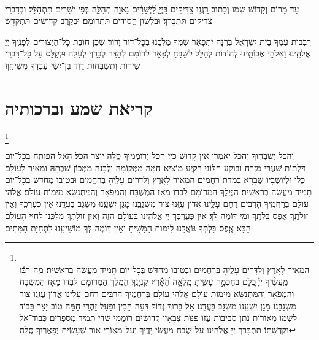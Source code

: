 \documentclass[twoside, openany, parskip=half, 11pt]{book}
\begin{document}
\\
עַד מָרוֹם וְקָדוֹשׁ שְׁמוֹ וְכָתוּב׃ רַֽנֲנ֣וּ צַ֭דִּיקִים בַּֽיְיָ֑ לַ֝יְשָׁרִ֗ים נָאוָ֥ה תְהִלָּֽה׃ בְּפִי יְשָׁרִים תִּתְהַלָּל׃ וּבְדִבְרֵי צַדִּיקִים תִּתְבָּרַךְ׃ וּבִלְשׁוֹן חֲסִידִים תִּתְרוֹמָם׃ וּבְקֶֽרֶב קְדוֹשִׁים תִּתְקַדָּשׁ׃

רִבְבוֹת עַמְּךָ בֵּית יִשְׂרָאֵל בְּרִנָּה יִתְפָּאַר שִׁמְךָ מַלְכֵּֽנוּ בְּכׇל־דּוֹר וָדוֹר׃ שֶׁכֵּן חוֹבַת כׇּל־הַיְצוּרִים לְפָנֶֽיךָ יְיָ אֱלֹהֵֽינוּ וֵאלֹהֵי אֲבוֹתֵֽינוּ לְהוֹדוֹת לְהַלֵּל לְשַׁבֵּֽחַ לְפָאֵר לְרוֹמֵם לְהַדֵּר לְבָרֵךְ לְעַלֵּה וּלְקַלֵּס עַל כׇּל־דִּבְרֵי שִׁירוֹת וְתֻשְׁבְּחוֹת דָּוִד בֶּן־יִשַׁי עַבְדְּךָ מְשִׁיחֶֽךָ׃


\yishtabach
\mimaamakim
\halfkaddish

\section[קריאת שמע וברכותיה]{ קריאת שמע וברכותיה }

\barachu


\footnote{\\
הַמֵּאִיר לָאָֽרֶץ וְלַדָּרִים עָלֶֽיהָ בְּרַחֲמִים וּבְטוּבוֹ מְחַדֵּשׁ בְּכׇל־יוֹם תָּמִיד מַעֲשֵׂה בְרֵאשִׁית׃
מָֽה־רַבּ֬וּ מַֽעֲשֶׂ֨יךָ יְיָ֗ ֖כֻּלָּם בְּחָכְמָ֣ה עָשִׂ֑יתָ מָֽלְאָ֥ה הָ֝אָ֗רֶץ קִנְיָנֶֽךָ׃ הַמֶּֽלֶךְ הַמְרוֹמָם לְבַדּוֹ מֵאָז הַמְשֻׁבָּח וְהַמְפֹאָר וְהַמִּתְנַשֵּׂא מִימוֹת עוֹלָם׃ אֱלֹהֵי עוֹלָם בְּרַחֲמֶיךָ הָרַבִּים רַחֵם עָלֵינוּ אֲדוֹן עֻזֵּֽנוּ צוּר מִשְׂגַּבֵּנוּ מָגֵן יִשְׁעֵֽנוּ מִשְׂגָּב בַּעֲדֵֽנוּ׃ אֵל בָּרוּךְ גְּדוֹל דֵּעָה הֵכִין וּפָעַל זׇהֳרֵי חַמָּה טוֹב יָצַר כָּבוֹד לִשְׁמוֹ מְאוֹרוֹת נָתַן סְבִיבוֹת עֻזּוֹ פִּנּוֹת צְבָאָיו קְדוֹשִׁים רוֹמֲמֵי שַׁדַּי תָּמִיד מְסַפְּרִים כְּבוֹד־אֵל וּקְדֻשָׁתוֹ׃ תִּתְבָּרַךְ יְיָ אֱלֹהֵֽינוּ עַל־שֶׁבַח מַעֲשֵׂי יָדֶֽיךָ וְעַל־מְאֽוֹרֵי אוֹר שֶׁעָשִֽׂיתָ יְפָאֲרֽוּךָ סֶּֽלָה׃
}



וְהַכֹּל יְשַׁבְּחֽוּךָ וְהַכֹּל יֹאמְרוּ אֵין קָדוֹשׁ כַּיָי׃ הַכֹּל יְרוֹמְמֽוּךָ סֶּֽלָה יוֹצֵר הַכֹּל׃ הָאֵל הַפּוֹתֵֽחַ בְּכׇל־יוֹם דַּלְתוֹת שַׁעֲרֵי מִזְרָח
וּבוֹקֵֽעַ חַלּוֹנֵי רָקִֽיעַ מוֹצִיא חַמָּה מִמְּקוֹמָהּ וּלְבָנָה מִמְּכוֹן שִׁבְתָּהּ
וּמֵאִיר לָעוֹלָם כֻּלּוֹ וּלְיוֹשְׁבָיו שֶׁבָּרָא בְּמִדַּת רַחֲמִים׃ הַמֵּאִיר לָאָֽרֶץ וְלַדָּרִים עָלֶֽיהָ בְּרַחֲמִים וּבְטוּבוֹ מְחַדֵּשׁ בְּכׇל־יוֹם תָּמִיד מַעֲשֵׂה בְרֵאשִׁית׃
הַמֶּֽלֶךְ הַמְּרוֹמָם לְבַדּוֹ מֵאָז הַמְשֻׁבָּח וְהַמְפֹאָר וְהַמִּתְנַשֵּׂא מִימוֹת עוֹלָם׃ אֱלֹהֵי עוֹלָם בְּרַחֲמֶֽיךָ הָרַבִּים רַחֵם עָלֵֽינוּ אֲדוֹן עֻזֵּֽנוּ צוּר מִשְׂגַּבֵּֽנוּ מָגֵן יִשְׁעֵֽנוּ מִשְׂגָּב בַּעֲדֵֽנוּ׃
אֵין כְּעֶרְכֶּֽךָ וְאֵין זוּלָתֶֽךָ אֶפֶס בִּלְתֶּֽךָ וּמִי דּֽוֹמֶה לָּךְ׃
אֵין כְּעֶרְכְּךָ יְיָ אֱלֹהֵֽינוּ בָּעוֹלָם הַזֶּה וְאֵין זוּלָתְךָ מַלְכֵּֽנוּ לְחַיֵּי הָעוֹלָם הַבָּא׃
אֶֽפֶס בִּלְתְּךָ גּוֹאֲלֵֽנוּ לִימוֹת הַמָּשִֽׁיחַ וְאֵין דּֽוֹמֶה לְּךָ מוֹשִׁיעֵֽנוּ לִתְחִיַּת הַמֵּתִים׃
\end{document}
